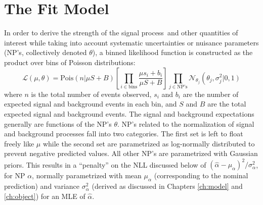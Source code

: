 \section{The Fit Model}
In order to derive the strength of the signal process \ZH\,and other quantities of interest while taking into account systematic uncertainties or nuisance parameters (NP's, collectively denoted $\theta$), a binned likelihood function is constructed as the product over bins of Poisson distributions:
\begin{equation}
\label{eqn:like}
\mathcal{L}\left(\mu,\theta\right)=\text{Pois}\left(n\right.\left|\mu S+B\right)\left[\prod_{i\in\text{bins}}\frac{\mu s_i+b_i}{\mu S+B}\right]\prod_{j\in\text{NP's}}\mathcal{N}_{\theta_j}\left(\theta_j,\sigma_j^2\right.\left|0,1\right)
\end{equation}
where $n$ is the total number of events observed, $s_i$ and $b_i$ are the number of expected signal and background events in each bin, and $S$ and $B$ are the total expected signal and background events.  The signal and background expectations generally are functions of the  NP's $\theta$.  NP's related to the normalization of signal and background processes fall into two categories.  The first set is left to float freely like $\mu$ while the second set are parametrized as log-normally distributed to prevent negative predicted values.  All other NP's are parametrized with Gaussian priors.  This results in a ``penalty'' on the NLL discussed below of $\left(\hat{\alpha}-\mu_{\alpha}\right)^2/\sigma_{\alpha}^2$, for NP $\alpha$, normally parametrized with mean $\mu_{\alpha}$ (corresponding to the nominal prediction) and variance $\sigma_{\alpha}^2$ (derived as discussed in Chapters \ref{ch:model} and \ref{ch:object}) for an MLE of $\hat{\alpha}$.  

